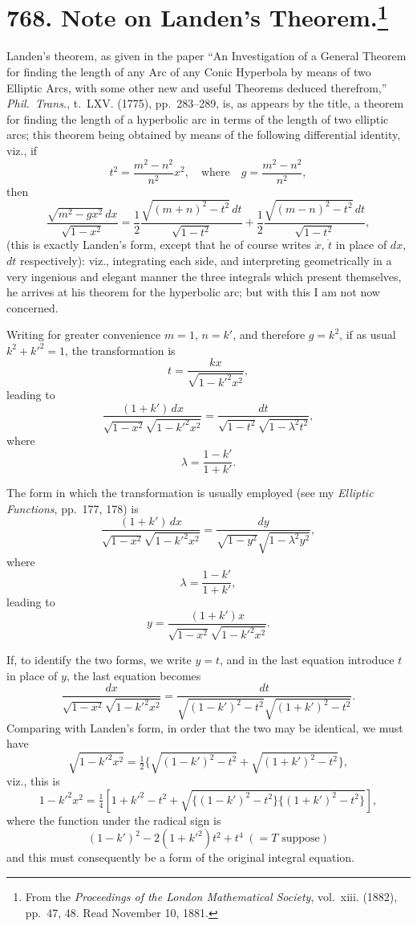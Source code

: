\documentclass[11pt,a4paper]{article}
\theoremstyle{definition}
\begin{document}
\newpage
\section[Note on Landen's Theorem]{768. Note on Landen's Theorem.\footnote{From the \textit{Proceedings of the London Mathematical Society}, vol.~xiii. (1882), pp.~47, 48. Read November 10, 1881.}}

Landen's theorem, as given in the paper ``An Investigation of a General Theorem for finding the length of any Arc of any Conic Hyperbola by means of two Elliptic Arcs, with some other new and useful Theorems deduced therefrom,'' \textit{Phil.~Trans.}, t.~LXV. (1775), pp.~283--289, is, as appears by the title, a theorem for finding the length of a hyperbolic arc in terms of the length of two elliptic arcs; this theorem being obtained by means of the following differential identity, viz., if
\[
t^2 = \frac{m^2 - n^2}{n^2} x^2,\quad \text{where}\quad g = \frac{m^2 - n^2}{n^2},
\]
then
\[
\frac{\sqrt{m^2 - gx^2}\,dx}{\sqrt{1 - x^2}} = \frac{1}{2}\frac{\sqrt{(m + n)^2 - t^2}\,dt}{\sqrt{1 - t^2}} + \frac{1}{2}\frac{\sqrt{(m - n)^2 - t^2}\,dt}{\sqrt{1 - t^2}},
\]
(this is exactly Landen's form, except that he of course writes $\dot{x}$, $\dot{t}$ in place of $dx$, $dt$ respectively): viz., integrating each side, and interpreting geometrically in a very ingenious and elegant manner the three integrals which present themselves, he arrives at his theorem for the hyperbolic arc; but with this I am not now concerned.

Writing for greater convenience $m = 1$, $n = k'$, and therefore $g = k^2$, if as usual $k^2 + k'^2 = 1$, the transformation is
\[
t = \frac{kx}{\sqrt{1 - k'^2x^2}},
\]
leading to
\[
\frac{(1 + k')\,dx}{\sqrt{1 - x^2}\sqrt{1 - k'^2x^2}} = \frac{dt}{\sqrt{1 - t^2}\sqrt{1 - \lambda^2t^2}},
\]
where
\[
\lambda = \frac{1 - k'}{1 + k'}.
\]

The form in which the transformation is usually employed (see my \textit{Elliptic Functions}, pp.~177, 178) is
\[
\frac{(1 + k')\,dx}{\sqrt{1 - x^2}\sqrt{1 - k'^2x^2}} = \frac{dy}{\sqrt{1 - y^2}\sqrt{1 - \lambda^2y^2}},
\]
where
\[
\lambda = \frac{1 - k'}{1 + k'},
\]
leading to
\[
y = \frac{(1 + k')x}{\sqrt{1 - x^2}\sqrt{1 - k'^2x^2}}.
\]

If, to identify the two forms, we write $y = t$, and in the last equation introduce $t$ in place of $y$, the last equation becomes
\[
\frac{dx}{\sqrt{1 - x^2}\sqrt{1 - k'^2x^2}} = \frac{dt}{\sqrt{(1 - k')^2 - t^2}\sqrt{(1 + k')^2 - t^2}}.
\]
Comparing with Landen's form, in order that the two may be identical, we must have
\[
\sqrt{1 - k'^2x^2} = \tfrac{1}{2}\{\sqrt{(1 - k')^2 - t^2} + \sqrt{(1 + k')^2 - t^2}\},
\]
viz., this is
\[
1 - k'^2x^2 = \tfrac{1}{4}[1 + k'^2 - t^2 + \sqrt{\{(1 - k')^2 - t^2\}\{(1 + k')^2 - t^2\}}],
\]
where the function under the radical sign is
\[
(1 - k')^2 - 2(1 + k'^2)t^2 + t^4\;(= T \text{ suppose})
\]
and this must consequently be a form of the original integral equation.
\end{document}
